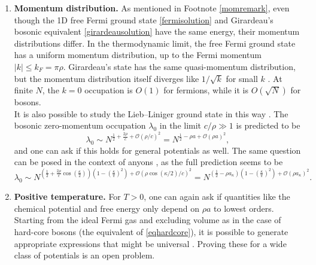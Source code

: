 \documentclass[a4paper,11pt]{article}
\newcommand{\abs}[1]{\left\lvert #1 \right\rvert}
\numberwithin{equation}{section}
\begin{document}
\begin{enumerate}
		\item \textbf{Momentum distribution.}
		As mentioned in Footnote \ref{momremark}, even though the 1D free Fermi ground state \eqref{fermisolution} and Girardeau's bosonic equivalent \eqref{girardeausolution} have the same energy, their momentum distributions differ. In the thermodynamic limit, the free Fermi ground state has a uniform momentum distribution, up to the Fermi momentum $|k|\leq k_F=\pi\rho$. Girardeau's state has the same quasi-momentum distribution, but the momentum distribution itself diverges like $1/\sqrt{k}$ for small $k$ \cite{lenard1964momentum,vaidya1979one}. At finite $N$, the $k=0$ occupation is $O(1)$ for fermions, while it is $O(\sqrt{N})$ for bosons.\\
		It is also possible to study the Lieb--Liniger ground state in this way \cite{colcelli2018deviations}. The bosonic zero-momentum occupation $\lambda_0$ in the limit $c/\rho\gg1$ is predicted to be 
		\begin{equation}
			\lambda_0\sim N^{\frac12+\frac{2\rho}{c}+\mathcal{O}(\rho/c)^2}=N^{\frac12-\rho a+\mathcal{O}(\rho a)^2}, 
		\end{equation}
		and one can ask if this holds for general potentials as well. The same question can be posed in the context of anyons \cite{colcelli2018deviations}, as the full prediction seems to be \cite{colcelli2018deviations,batchelor2006one}
		\begin{equation}
			\lambda_0\sim N^{\left(\frac12+\frac{2\rho}{c}\cos\left(\frac{\kappa}{2}\right)\right)\left(1-\left(\frac{\kappa}{\pi}\right)^2\right)+\mathcal{O}(\rho \cos(\kappa/2)/c)^2}=N^{\left(\frac12-\rho a_\kappa\right)\left(1-\left(\frac{\kappa}{\pi}\right)^2\right)+\mathcal{O}(\rho a_\kappa)^2}.
		\end{equation}
		\item \textbf{Positive temperature.} For $T>0$, one can again ask if quantities like the chemical potential and free energy only depend on $\rho a$ to lowest orders. Starting from the ideal Fermi gas and excluding volume as in the case of hard-core bosons (the equivalent of \eqref{eqhardcore}), it is possible to generate appropriate expressions that might be universal \cite{de2019beyond}. Proving these for a wide class of potentials is an open problem. 
	\end{enumerate}
	
	
	
\end{document}
